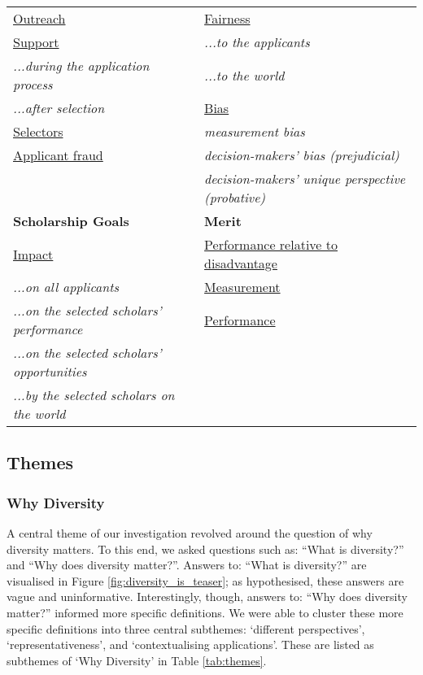 \begin{table}[htbp]
\begin{tabular}{|p{}|p{}|}
        \underline{Outreach} & \underline{Fairness} \\
        \underline{Support} & \emph{...to the applicants} \\
        \emph{...during the application process} & \emph{...to the world} \\
        \emph{...after selection} & \underline{Bias} \\
        \underline{Selectors} & \emph{measurement bias} \\
        \underline{Applicant fraud} & \emph{decision-makers' bias (prejudicial)} \\
         & \emph{decision-makers' unique perspective (probative)} \\
        \hline
        \textbf{Scholarship Goals} & \textbf{Merit} \\
        \underline{Impact} & \underline{Performance relative to disadvantage} \\
        \emph{...on all applicants} & \underline{Measurement} \\
        \emph{...on the selected scholars' performance} & \underline{Performance} \\
        \emph{...on the selected scholars' opportunities} & \\
        \emph{...by the selected scholars on the world} & \\
        \hline
    \end{tabular}
\end{table}

\subsection{Themes}\label{ssec:themes}
\subsubsection{Why Diversity}
A central theme of our investigation revolved around the question of why diversity matters. To this end, we asked questions such as: ``What is diversity?'' and ``Why does diversity matter?''. Answers to: ``What is diversity?'' are visualised in Figure \ref{fig:diversity_is_teaser}; as hypothesised, these answers are vague and uninformative. Interestingly, though, answers to: ``Why does diversity matter?'' informed more specific definitions. We were able to cluster these more specific definitions into three central subthemes: `different perspectives', `representativeness', and `contextualising applications'. These are listed as subthemes of `Why Diversity' in Table \ref{tab:themes}.

